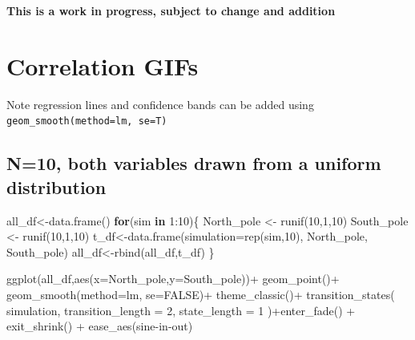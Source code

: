 \documentclass[
  letterpaper,
  DIV=11,
  numbers=noendperiod]{scrreprt}
\newenvironment{Shaded}{\begin{snugshade}}{\end{snugshade}}
\newcommand{\AttributeTok}[1]{\textcolor[rgb]{0.40,0.45,0.13}{#1}}
\newcommand{\ConstantTok}[1]{\textcolor[rgb]{0.56,0.35,0.01}{#1}}
\newcommand{\ControlFlowTok}[1]{\textcolor[rgb]{0.00,0.23,0.31}{\textbf{#1}}}
\newcommand{\DecValTok}[1]{\textcolor[rgb]{0.68,0.00,0.00}{#1}}
\newcommand{\FunctionTok}[1]{\textcolor[rgb]{0.28,0.35,0.67}{#1}}
\newcommand{\NormalTok}[1]{\textcolor[rgb]{0.00,0.23,0.31}{#1}}
\newcommand{\OtherTok}[1]{\textcolor[rgb]{0.00,0.23,0.31}{#1}}
\newcommand{\SpecialCharTok}[1]{\textcolor[rgb]{0.37,0.37,0.37}{#1}}
\newcommand{\StringTok}[1]{\textcolor[rgb]{0.13,0.47,0.30}{#1}}
\begin{document}
\textbf{This is a work in progress, subject to change and addition}

\section{Correlation GIFs}\label{correlation-gifs}

Note regression lines and confidence bands can be added using
\texttt{geom\_smooth(method=lm,\ se=T)}

\subsection{N=10, both variables drawn from a uniform
distribution}\label{n10-both-variables-drawn-from-a-uniform-distribution}

\begin{Shaded}
\begin{Highlighting}[]
\NormalTok{all\_df}\OtherTok{\textless{}{-}}\FunctionTok{data.frame}\NormalTok{()}
\ControlFlowTok{for}\NormalTok{(sim }\ControlFlowTok{in} \DecValTok{1}\SpecialCharTok{:}\DecValTok{10}\NormalTok{)\{}
\NormalTok{  North\_pole }\OtherTok{\textless{}{-}} \FunctionTok{runif}\NormalTok{(}\DecValTok{10}\NormalTok{,}\DecValTok{1}\NormalTok{,}\DecValTok{10}\NormalTok{)}
\NormalTok{  South\_pole }\OtherTok{\textless{}{-}} \FunctionTok{runif}\NormalTok{(}\DecValTok{10}\NormalTok{,}\DecValTok{1}\NormalTok{,}\DecValTok{10}\NormalTok{)}
\NormalTok{  t\_df}\OtherTok{\textless{}{-}}\FunctionTok{data.frame}\NormalTok{(}\AttributeTok{simulation=}\FunctionTok{rep}\NormalTok{(sim,}\DecValTok{10}\NormalTok{),}
\NormalTok{                                  North\_pole,}
\NormalTok{                                  South\_pole)}
\NormalTok{  all\_df}\OtherTok{\textless{}{-}}\FunctionTok{rbind}\NormalTok{(all\_df,t\_df)}
\NormalTok{\}}


\FunctionTok{ggplot}\NormalTok{(all\_df,}\FunctionTok{aes}\NormalTok{(}\AttributeTok{x=}\NormalTok{North\_pole,}\AttributeTok{y=}\NormalTok{South\_pole))}\SpecialCharTok{+}
  \FunctionTok{geom\_point}\NormalTok{()}\SpecialCharTok{+}
  \FunctionTok{geom\_smooth}\NormalTok{(}\AttributeTok{method=}\NormalTok{lm, }\AttributeTok{se=}\ConstantTok{FALSE}\NormalTok{)}\SpecialCharTok{+}
  \FunctionTok{theme\_classic}\NormalTok{()}\SpecialCharTok{+}
  \FunctionTok{transition\_states}\NormalTok{(}
\NormalTok{    simulation,}
    \AttributeTok{transition\_length =} \DecValTok{2}\NormalTok{,}
    \AttributeTok{state\_length =} \DecValTok{1}
\NormalTok{  )}\SpecialCharTok{+}\FunctionTok{enter\_fade}\NormalTok{() }\SpecialCharTok{+} 
  \FunctionTok{exit\_shrink}\NormalTok{() }\SpecialCharTok{+}
  \FunctionTok{ease\_aes}\NormalTok{(}\StringTok{\textquotesingle{}sine{-}in{-}out\textquotesingle{}}\NormalTok{)}
\end{Highlighting}
\end{Shaded}
\end{document}
